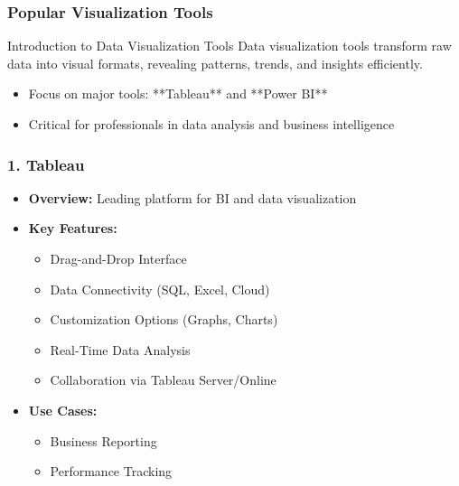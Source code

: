 \documentclass{beamer}
\begin{document}
\begin{frame}[fragile]
    \frametitle{Popular Visualization Tools}
    \begin{block}{Introduction to Data Visualization Tools}
        Data visualization tools transform raw data into visual formats, revealing patterns, trends, and insights efficiently.
    \end{block}
    \begin{itemize}
        \item Focus on major tools: **Tableau** and **Power BI**
        \item Critical for professionals in data analysis and business intelligence
    \end{itemize}
\end{frame}

\begin{frame}[fragile]
    \frametitle{1. Tableau}
    \begin{itemize}
        \item \textbf{Overview:} Leading platform for BI and data visualization
        \item \textbf{Key Features:}
        \begin{itemize}
            \item Drag-and-Drop Interface
            \item Data Connectivity (SQL, Excel, Cloud)
            \item Customization Options (Graphs, Charts)
            \item Real-Time Data Analysis
            \item Collaboration via Tableau Server/Online
        \end{itemize}
        \item \textbf{Use Cases:}
        \begin{itemize}
            \item Business Reporting
            \item Performance Tracking
        \end{itemize}
    \end{itemize}
\end{frame}
\end{document}
